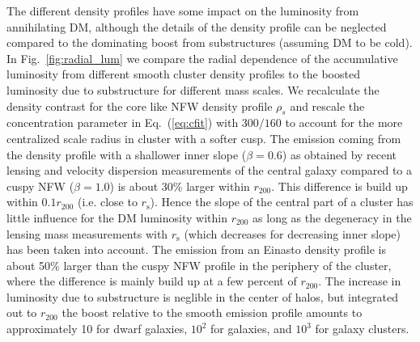 \documentclass[10pt,aps,pra,reprint,amsmath,amsfonts,amssymb,showpacs,nofootinbib,floatfix]{revtex4-1}
\newcommand{\rmn}{\mathrm}
\newcommand{\s}{\rmn{s}}
\newcommand{\rhos}{\ensuremath{\rho_s}}
\newcommand{\rvir}{r_{200}}
\begin{document}
The different density profiles have some impact on the luminosity from
annihilating DM, although the details of the density profile can be
neglected compared to the dominating boost from substructures
(assuming DM to be cold). In Fig.~\ref{fig:radial_lum} we compare the
radial dependence of the accumulative luminosity from different smooth
cluster density profiles to the boosted luminosity due to substructure
for different mass scales. We recalculate the density contrast for the
core like NFW density profile $\rhos$ and rescale the concentration
parameter in Eq.~(\ref{eq:cfit}) with $300/160$
\cite{2011ApJ...728L..39N} to account for the more centralized scale
radius in cluster with a softer cusp. The emission coming from the
density profile with a shallower inner slope ($\beta=0.6$) as obtained
by recent lensing and velocity dispersion measurements of the central
galaxy \cite{2011ApJ...728L..39N} compared to a cuspy NFW
($\beta=1.0$) is about 30\% larger within $\rvir$. This difference is
build up within $0.1\rvir$ (i.e. close to $r_\s$). Hence the slope of
the central part of a cluster has little influence for the DM
luminosity within $\rvir$ as long as the degeneracy in the lensing
mass measurements with $r_\s$ (which decreases for decreasing inner
slope) has been taken into account. The emission from an Einasto
density profile is about 50\% larger than the cuspy NFW profile in the
periphery of the cluster, where the difference is mainly build up at a
few percent of $\rvir$. The increase in luminosity due to substructure
is neglible in the center of halos, but integrated out to $\rvir$ the
boost relative to the smooth emission profile amounts to approximately
10 for dwarf galaxies, $10^2$ for galaxies, and $10^3$ for galaxy
clusters.
\end{document}
